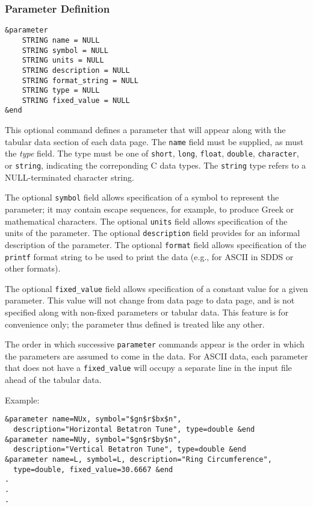 \documentclass[11pt]{article}
\begin{document}
\subsubsection{Parameter Definition}
\begin{verbatim}
&parameter
    STRING name = NULL
    STRING symbol = NULL
    STRING units = NULL
    STRING description = NULL
    STRING format_string = NULL
    STRING type = NULL
    STRING fixed_value = NULL
&end
\end{verbatim}

This optional command defines a parameter that will appear along with the tabular data section of each data page.  The {\tt name} field must be supplied, as must the {\em type} field.  The type must be one of {\tt short}, {\tt long}, {\tt float}, {\tt double}, {\tt character}, or {\tt string}, indicating the correponding C data types.  The {\tt string} type refers to a NULL-terminated character string.

The optional {\tt symbol} field allows specification of a symbol to represent the parameter; it may contain escape sequences, for example, to produce Greek or mathematical characters.  The optional {\tt units} field allows specification of the units of the parameter.  The optional {\tt description} field provides for an informal description of the parameter.  The optional {\tt format} field allows specification of the {\tt printf} format string to be used to print the data (e.g., for ASCII in SDDS or other formats).

The optional {\tt fixed\_value} field allows specification of a constant value for a given parameter.  This value will not change from data page to data page, and is not specified along with non-fixed parameters or tabular data.  This feature is for convenience  only; the parameter thus defined is treated like any other.

The order in which successive {\tt parameter} commands appear is the order in which the parameters are assumed to come in the data.  For ASCII data, each parameter that does not have a {\tt fixed\_value} will occupy a separate line in the input file ahead of the tabular data.

Example:
\begin{verbatim}
&parameter name=NUx, symbol="$gn$r$bx$n", 
  description="Horizontal Betatron Tune", type=double &end
&parameter name=NUy, symbol="$gn$r$by$n", 
  description="Vertical Betatron Tune", type=double &end
&parameter name=L, symbol=L, description="Ring Circumference", 
  type=double, fixed_value=30.6667 &end
.
.
.
\end{verbatim}
\end{document}
